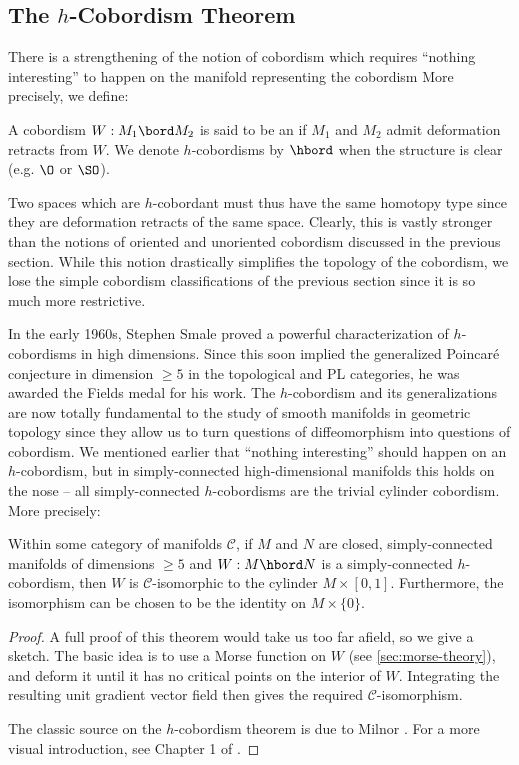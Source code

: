 \subsection{The $h$-Cobordism Theorem}

There is a strengthening of the notion of cobordism which requires ``nothing interesting'' to happen on the manifold representing the cobordism
More precisely, we define:
\begin{definition}
	A cobordism $W : M_1\bord M_2$ is said to be an  if $M_1$ and $M_2$ admit deformation retracts from $W$. We denote $h$-cobordisms by $\hbord$ when the structure is clear (e.g. $\O$ or $\SO$).
\end{definition}

Two spaces which are $h$-cobordant must thus have the same homotopy type since they are deformation retracts of the same space. Clearly, this is vastly stronger than the notions of oriented and unoriented cobordism discussed in the previous section. While this notion drastically simplifies the topology of the cobordism, we lose the simple cobordism classifications of the previous section since it is so much more restrictive. 

In the early 1960s, Stephen Smale proved \cite{smale1961generalized} a powerful characterization of $h$-cobordisms in high dimensions. Since this soon implied the generalized Poincar\'e conjecture in dimension $\geq 5$ in the topological and PL categories, he was awarded the Fields medal for his work. 
The $h$-cobordism and its generalizations are now totally fundamental to the study of smooth manifolds in geometric topology since they allow us to turn questions of diffeomorphism into questions of cobordism.
We mentioned earlier that ``nothing interesting'' should happen on an $h$-cobordism, but in simply-connected high-dimensional manifolds this holds on the nose -- all simply-connected $h$-cobordisms are the trivial cylinder cobordism. More precisely:

\begin{theorem}[$h$-cobordism]\label{thm:h-cobordism}
	Within some category of manifolds $\mathscr{C}$, if $M$ and $N$ are closed, simply-connected manifolds of dimensions $\geq 5$ and $W : M \hbord N$ is a simply-connected $h$-cobordism, then $W$ is $\mathscr{C}$-isomorphic to the cylinder $M\times [0,1]$. Furthermore, the isomorphism can be chosen to be the identity on $M\times \{0\}$.
\end{theorem}
\begin{proof}
	A full proof of this theorem would take us too far afield, so we give a sketch. The basic idea is to use a Morse function on $W$ (see \cref{sec:morse-theory}), and deform it until it has no critical points on the interior of $W$. Integrating the resulting unit gradient vector field then gives the required $\mathscr{C}$-isomorphism.

	The classic source on the $h$-cobordism theorem is due to Milnor \cite{milnor1965hcobordism}. For a more visual introduction, see Chapter 1 of \cite{scorpan2005wild}.
\end{proof}

